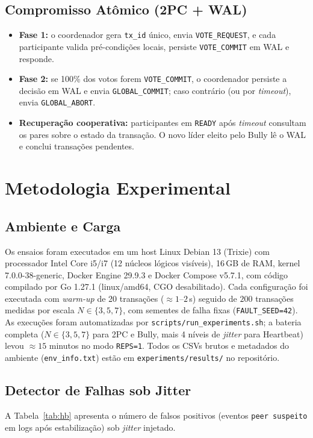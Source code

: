 \documentclass[conference]{IEEEtran}
\begin{document}
\subsection{Compromisso Atômico (2PC + WAL)}
\begin{itemize}
  \item \textbf{Fase 1:} o coordenador gera \texttt{tx\_id} único, envia \texttt{VOTE\_REQUEST}, e cada participante valida pré-condições locais, persiste \texttt{VOTE\_COMMIT} em WAL e responde.
  \item \textbf{Fase 2:} se 100\% dos votos forem \texttt{VOTE\_COMMIT}, o coordenador persiste a decisão em WAL e envia \texttt{GLOBAL\_COMMIT}; caso contrário (ou por \textit{timeout}), envia \texttt{GLOBAL\_ABORT}.
  \item \textbf{Recuperação cooperativa:} participantes em \texttt{READY} após \textit{timeout} consultam os pares sobre o estado da transação. O novo líder eleito pelo Bully lê o WAL e conclui transações pendentes.
\end{itemize}

\section{Metodologia Experimental}

\subsection{Ambiente e Carga}
Os ensaios foram executados em um host Linux Debian 13 (Trixie) com processador Intel Core i5/i7 (12 núcleos lógicos visíveis), 16\,GB de RAM, kernel 7.0.0-38-generic, Docker Engine 29.9.3 e Docker Compose v5.7.1, com código compilado por Go 1.27.1 (linux/amd64, CGO desabilitado). Cada configuração foi executada com \emph{warm-up} de 20 transações ($\approx 1$--$2$\,s) seguido de $200$ transações medidas por escala $N\in\{3,5,7\}$, com sementes de falha fixas (\texttt{FAULT\_SEED=42}). As execuções foram automatizadas por \texttt{scripts/run\_experiments.sh}; a bateria completa ($N\in\{3,5,7\}$ para 2PC e Bully, mais 4 níveis de \emph{jitter} para Heartbeat) levou $\approx 15$ minutos no modo \texttt{REPS=1}. Todos os CSVs brutos e metadados do ambiente (\texttt{env\_info.txt}) estão em \texttt{experiments/results/} no repositório.

\subsection{Detector de Falhas sob Jitter}
A Tabela~\ref{tab:hb} apresenta o número de falsos positivos (eventos \texttt{peer suspeito} em logs após estabilização) sob \textit{jitter} injetado.
\end{document}
